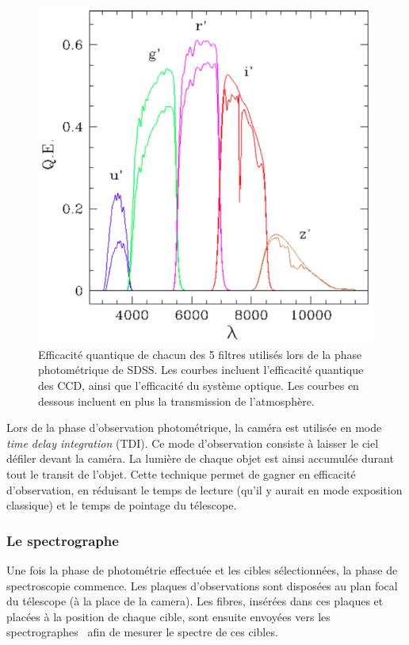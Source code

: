 \documentclass[11pt, twoside, a4paper, openright]{report}
\begin{document}
\begin{figure}
  \centering
  \includegraphics[scale=0.4]{../img/eBOSS/Filtres}
  \caption{Efficacité quantique de chacun des 5 filtres utilisés lors de la phase photométrique de SDSS. Les courbes incluent l'efficacité quantique des CCD, ainsi que l'efficacité du système optique. Les courbes en dessous incluent en plus la transmission de l'atmosphère.}
  \label{fig:Filtres}
\end{figure}

Lors de la phase d'observation photométrique, la caméra est utilisée en mode \emph{time delay integration} (TDI). Ce mode d'observation consiste à laisser le ciel défiler devant la caméra. La lumière de chaque objet est ainsi accumulée durant tout le transit de l'objet. Cette technique permet de gagner en efficacité d'observation, en réduisant le temps de lecture (qu'il y aurait en mode exposition classique) et le temps de pointage du télescope.


\subsubsection{Le spectrographe}
Une fois la phase de photométrie effectuée et les cibles sélectionnées, la phase de spectroscopie commence. Les plaques d'observations sont disposées au plan focal du télescope (à la place de la camera). Les fibres, insérées dans ces plaques et placées à la position de chaque cible, sont ensuite envoyées vers les spectrographes~\cite{Smee2012} afin de mesurer le spectre de ces cibles.
\end{document}
